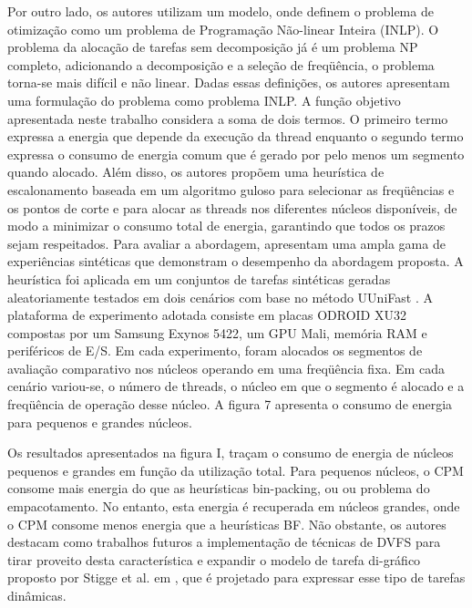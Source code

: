 Por outro lado, os autores utilizam um modelo, onde definem o problema de otimização como um problema de Programação Não-linear Inteira (INLP). O problema da alocação de tarefas sem decomposição já é um problema NP completo, adicionando a decomposição e a seleção de freqüência, o problema torna-se mais difícil e não linear. Dadas essas definições, os autores apresentam uma formulação do problema como problema INLP. A função objetivo apresentada neste trabalho considera a soma de dois termos. O primeiro termo expressa a energia que depende da execução da thread enquanto o segundo termo expressa o consumo de energia comum que é gerado por pelo menos um segmento quando alocado. 
Além disso, os autores propõem uma heurística de escalonamento baseada em um algoritmo guloso para selecionar as freqüências e os pontos de corte e para alocar as threads nos diferentes núcleos disponíveis, de modo a minimizar o consumo total de energia, garantindo que todos os prazos sejam respeitados.
Para avaliar a abordagem, apresentam uma ampla gama de experiências sintéticas que demonstram o desempenho da abordagem proposta. A heurística foi aplicada em um conjuntos de tarefas sintéticas geradas aleatoriamente testados em dois cenários com base no método UUniFast \cite{davis2009priority}. A plataforma de experimento adotada consiste em placas ODROID XU32 compostas por um Samsung Exynos 5422, um GPU Mali, memória RAM e periféricos de E/S. Em cada experimento, foram alocados os segmentos de avaliação comparativo nos núcleos operando em uma freqüência fixa. Em cada cenário variou-se, o número de threads, o núcleo em que o segmento é alocado e a freqüência de operação desse núcleo. A figura 7 apresenta o consumo de energia para pequenos e grandes núcleos.





Os resultados apresentados na figura I, traçam o consumo de energia de núcleos pequenos e grandes em função da utilização total. Para pequenos núcleos, o CPM consome mais energia do que as heurísticas bin-packing, ou ou problema do empacotamento. No entanto, esta energia é recuperada em núcleos grandes, onde o CPM consome menos energia que a heurísticas BF. Não obstante, os autores destacam como trabalhos futuros a implementação de técnicas de DVFS para tirar proveito desta característica e expandir o modelo de tarefa di-gráfico proposto por Stigge et al. em \cite{stigge2011digraph}, que é projetado para expressar esse tipo de tarefas dinâmicas.



